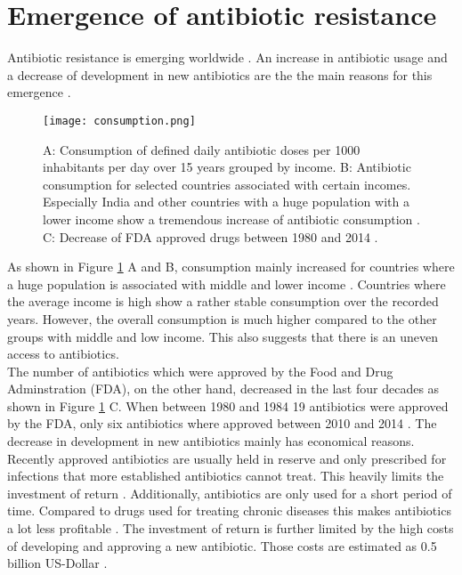 \section{Emergence of antibiotic resistance}
Antibiotic resistance is emerging worldwide \cite{ventola_antibiotic_2015}. An increase in antibiotic usage and a decrease of development in new antibiotics are the the main reasons for this emergence \cite{ventola_antibiotic_2015}. 
\begin{figure}[H]
	\texttt{[image: consumption.png]}
	\caption{A: Consumption of defined daily antibiotic doses per 1000 inhabitants per day over 15 years grouped by income.  B: Antibiotic consumption for selected countries associated with certain incomes. Especially India and other countries with a huge population with a lower income show a tremendous increase of antibiotic consumption \cite{klein_global_2018}. C: Decrease of FDA approved drugs between 1980 and 2014 \cite{ventola_antibiotic_2015}.}
	\label{figure:emergence}
\end{figure}
As shown in Figure \ref{figure:emergence} A and B, consumption mainly increased for countries where a huge population is associated with middle and lower income \cite{klein_global_2018}. Countries where the average income is high show a rather stable consumption over the recorded years. However, the overall consumption is much higher compared to the other groups with middle and low income. This also suggests that there is an uneven access to antibiotics. \\
The number of antibiotics which were approved by the Food and Drug  Adminstration (FDA), on the other hand, decreased in the last four decades as shown in Figure \ref{figure:emergence} C. When between 1980 and 1984 19 antibiotics were approved by the FDA, only six antibiotics where approved between 2010 and 2014 \cite{ventola_antibiotic_2015}. The decrease in development in new antibiotics mainly has economical reasons. Recently approved antibiotics are usually held in reserve and only prescribed for infections that more established antibiotics cannot treat. This heavily limits the investment of return \cite{fair_antibiotics_2014}. Additionally, antibiotics are only used for a short period of time. Compared to drugs used for treating chronic diseases this makes antibiotics a lot less profitable  \cite{fair_antibiotics_2014}. The investment of return is further limited by the high costs of developing and approving a new antibiotic. Those costs are estimated as 0.5 billion US-Dollar \cite{costs}. \\

